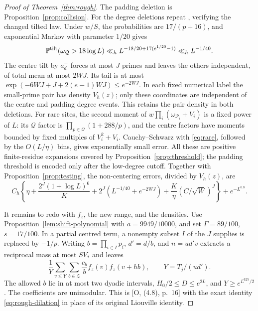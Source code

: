 \documentclass[11pt]{article}
\theoremstyle{definition}
\newcommand{\Prob}{\mathbb P}
\newcommand{\Pset}{\mathcal P}
\theoremstyle{remark}
\numberwithin{equation}{section}
\newcommand{\Qset}{\mathcal Q}
\begin{document}
\begin{proof}[Proof of Theorem~\ref{thm:rough}]
The padding deletion is Proposition~\ref{prop:collision}.
For the degree deletions repeat \cite[Lemma~4.6, pp.~19--20]{OpenAI007}, verifying the changed tilted law.
Under $w/S$, the probabilities are $17/(p+16)$, and exponential Markov with parameter $1/20$ gives
\begin{equation}\label{eq:q-degree-tail}
 \Prob^{\rm tilt}(\omega_{\Qset}>18\log L)
 \ll_h L^{-18/20+17(e^{1/20}-1)}\ll_h L^{-1/40}.
\end{equation}
The centre tilt by $a_d^+$ forces at most $J$ primes and leaves the others independent, of total mean at most
$2WJ$. Its tail is at most
$\exp(-6WJ+J+2(e-1)WJ)\le e^{-2WJ}$.
In each fixed numerical label the small-prime pair has density $V_h(z)$; only these coordinates are independent
of the centre and padding degree events. This retains the pair density in both deletions.
For rare sites, the second moment of
$w\prod_i(\omega_{\Pset_i}+V_i)$ is a fixed power of $L$: its $\Qset$ factor is
$\prod_{p\in\Qset}(1+288/p)$, and the centre factors have moments bounded by fixed multiples of $V_i^2+V_i$.
Cauchy--Schwarz with \eqref{eq:rare}, followed by the $O(L/\eta)$ bins, gives exponentially small error.
All these are positive finite-residue expansions covered by Proposition~\ref{prop:threshold}; the padding
threshold is encoded only after the low-degree cutoff.
Together with Proposition~\ref{prop:testing}, the non-centering errors, divided by $V_h(z)$, are
\begin{equation}\label{eq:rough-budget}
 C_h\left\{\eta+\frac{2^J(1+\log L)^6}{K}
 +2^J(L^{-1/40}+e^{-2WJ})+\frac K\eta(C/\sqrt W)^J\right\}+e^{-L^{0.8}}.
\end{equation}

It remains to redo \cite[Lemmas~4.1--4.2, 4.4, pp.~13--16]{OpenAI007} with $f_z$, the new range, and the densities.
Use Proposition~\ref{lem:shift-polynomial} with
$a=9949/10000$, and set $\Gamma=89/100$, $s=17/100$.
In a partial centred term, a nonempty subset $I$ of the $J$ supplies is replaced by $-1/p$.
Writing $b=\prod_{i\in I}p_i$, $d'=d/b$, and $n=ud'v$ extracts a reciprocal mass at most $SV_*$ and leaves
\begin{equation}\label{eq:partial-rough}
 \frac1Y\sum_{v\le Y}\sum_{b\in\mathcal Z}\frac{c_b}b f_z(v)f_z(v+hb),\qquad Y=T_j/(ud').
\end{equation}
The allowed $b$ lie in at most two dyadic intervals, $H_0/2\le D\le e^{2L}$, and $Y\ge e^{L^{625}/2}$.
The coefficients are unimodular. This is [O, (4.8), p.~16] with the exact identity
\eqref{eq:rough-dilation} in place of its original Liouville identity.


\end{proof}
\end{document}
